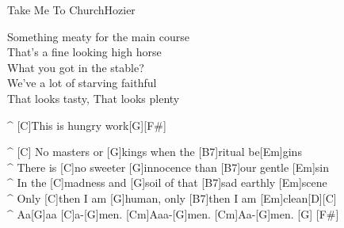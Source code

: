 \begin{song}{Take Me To Church}{Hozier}
\begin{guitar}
Something meaty for the main course\\
That's a fine looking high horse\\
What you got in the stable?\\
We've a lot of starving faithful\\
That looks tasty, That looks plenty\\
\end{guitar}

\begin{guitar}
^ [C]This is hungry work[G][F#]\\
\end{guitar}


\begin{guitar}
^ [C]  No masters or [G]kings when the [B7]ritual be[Em]gins\\
^ There is [C]no sweeter [G]innocence than [B7]our gentle [Em]sin\\
^ In the [C]madness and [G]soil of that [B7]sad earthly [Em]scene\\
^ Only [C]then I am [G]human, only [B7]then I am [Em]clean[D][C]\\
^ Aa[G]aa [C]a-[G]men. [Cm]Aaa-[G]men. [Cm]Aa-[G]men. [G]  [F#]\\
\end{guitar}




\end{song}
